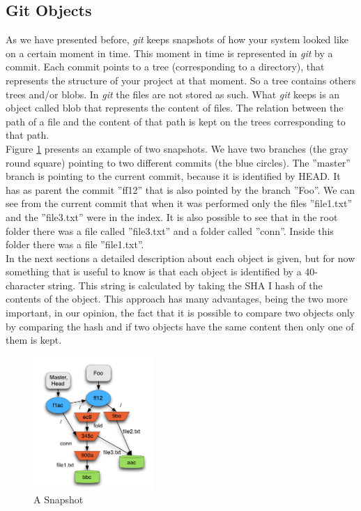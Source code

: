 \subsection{Git Objects}
As we have presented before, \emph{git} keeps snapshots of how your system
looked like on a certain moment in time. This moment in time is
represented in \emph{git} by a commit. Each commit points to a tree
(corresponding to a directory), that
represents the structure of your project at that moment. So a tree
contains others trees and/or blobs. In \emph{git} the files are not stored as such. 
What \emph{git} keeps is an object called blob that represents the content of files. The
relation between the path of a file and the content of that path 
is kept on the trees corresponding to that path. \\

Figure \ref{fig:snapshot} presents an example of two snapshots. We
have two branches (the gray round square) pointing to two different
commits (the blue circles). The ''master'' branch is pointing to the
current commit, because it is identified by HEAD. It has as parent the commit ''ff12''
that is also pointed by the branch ''Foo''. We can see from the current
commit that when it was performed only the files ''file1.txt'' and the
''file3.txt'' were
in the index. It is also possible to see that in the root folder there was
a file called ''file3.txt'' and a folder called ''conn''. Inside this
folder there was a file ''file1.txt''.\\

In the next sections a detailed description about each object is
given, but for now something that is useful to know is that each
object is identified by a 40-character string. This string is
calculated by taking the SHA I hash of the contents of the object.
This approach has many advantages, being the two more important, in our
opinion, the
fact that it is possible to compare two objects only by comparing the hash and
if two objects have the same content then only one of them is kept.

\begin{figure}[h]
   \centering
   \includegraphics[width=0.4\textwidth]{images/object_assoc.png}
   \caption{A Snapshot}
   \label{fig:snapshot}
\end{figure}

